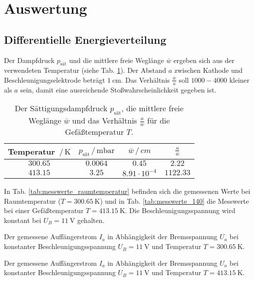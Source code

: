 \section{Auswertung}
\subsection{Differentielle Energieverteilung}
Der Dampfdruck $p_\text{sät}$ und die mittlere freie Weglänge $\bar{w}$ ergeben sich aus der verwendeten Temperatur (siehe Tab. \ref{tab:weglaenge}). %
Der Abstand $a$ zwischen Kathode und Beschleunigungselektrode beträgt $\SI{1}{\centi\metre}$.
Das Verhältnis $\frac{\bar{w}}{a}$ soll $1000 - 4000$ kleiner als $a$ sein, damit eine ausreichende Stoßwahrscheinlichkeit gegeben ist.
\begin{table}
    \centering
    \begin{tabular}{cccc}
        \toprule
        Temperatur $\,/\, \si{\kelvin}$ & $p_\text{sät} \,/\, \si{\milli\bar}$ & $\bar{w} \,/\, \si{cm}$ & $\frac{a}{\bar{w}}$ \\
        \midrule
        $300.65$ & $0.0064$ & $0.45$ & $2.22$ \\
        $413.15$ & $3.25$ & $8.91 \cdot 10^{-4}$ & $1122.33$ \\
        \bottomrule
    \end{tabular}
    \caption{Der Sättigungsdampfdruck $p_\text{sät}$, die mittlere freie Weglänge $\bar{w}$ und das Verhältnis $\frac{a}{\bar{w}}$ für die Gefäßtemperatur $T$.}
    \label{tab:weglaenge}
\end{table}

In Tab. \ref{tab:messwerte_raumtemperatur} befinden sich die gemessenen Werte bei Raumtemperatur ($T=\SI{300.65}{\kelvin}$) und in Tab. \ref{tab:messwerte_140} die Messwerte bei einer Gefäßtemperatur $T=\SI{413.15}{\kelvin}$.
Die Beschleunigungsspannung wird konstant bei $U_B = \SI{11}{\volt}$ gehalten.
\begin{table}
    \centering
    \caption{Der gemessene Auffängerstrom $I_a$ in Abhängigkeit der Bremsspannung $U_a$ bei konstanter Beschleunigungsspannung $U_B = \SI{11}{\volt}$ und Temperatur $T = \SI{300.65}{\kelvin}$.}
    \label{tab:messwerte_raumtemperatur}  
\end{table}

\begin{table}
    \centering
    \caption{Der gemessene Auffängerstrom $I_a$ in Abhängigkeit der Bremsspannung $U_a$ bei konstanter Beschleunigungsspannung $U_B = \SI{11}{\volt}$ und Temperatur $T = \SI{413.15}{\kelvin}$.}
    \label{tab:messwerte_140}  
\end{table}
